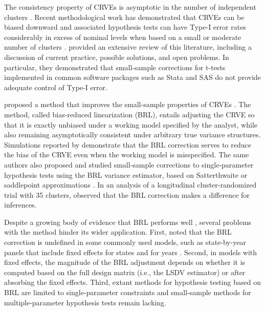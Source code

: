\documentclass[12pt]{article}\usepackage[]{graphicx}\usepackage[]{color}
\begin{document}
The consistency property of CRVEs is asymptotic in the number of independent clusters \citep{Wooldridge2003cluster}.
Recent methodological work has demonstrated that CRVEs can be biased downward and associated hypothesis tests can have Type-I error rates considerably in excess of nominal levels when based on a small or moderate number of clusters \citep[e.g.,][]{MacKinnon2016wild}.
\citet{Cameron2015practitioners} provided an extensive review of this literature, including a discussion of current practice, possible solutions, and open problems. 
In particular, they demonstrated that small-sample corrections for t-tests implemented in common software packages such as Stata and SAS do not provide adequate control of Type-I error. 

\citet{Bell2002bias} proposed a method that improves the small-sample properties of CRVEs \citep[see also][]{McCaffrey2001generalizations}. 
The method, called bias-reduced linearization (BRL), entails adjusting the CRVE so that it is exactly unbiased under a working model specified by the analyst, while also remaining asymptotically consistent under arbitrary true variance structures. 
Simulations reported by \citet{Bell2002bias} demonstrate that the BRL correction serves to reduce the bias of the CRVE even when the working model is misspecified. 
The same authors also proposed and studied small-sample corrections to single-parameter hypothesis tests using the BRL variance estimator, based on Satterthwaite \citep{Bell2002bias} or saddlepoint approximations \citep{McCaffrey2006improved}. 
In an analysis of a longitudinal cluster-randomized trial with 35 clusters, \citet{Angrist2009effects} observed that the BRL correction makes a difference for inferences. 

Despite a growing body of evidence that BRL performs well \citep[e.g.,][]{Imbens2015robust}, several problems with the method hinder its wider application. 
First, \citet{Angrist2009mostly} noted that the BRL correction is undefined in some commonly used models, such as state-by-year panels that include fixed effects for states and for years \citep[see also][]{Young2016improved}.
Second, in models with fixed effects, the magnitude of the BRL adjustment depends on whether it is computed based on the full design matrix (i.e., the LSDV estimator) or after absorbing the fixed effects.  
Third, extant methods for hypothesis testing based on BRL are limited to single-parameter constraints \citep{Bell2002bias, McCaffrey2006improved} and small-sample methods for multiple-parameter hypothesis tests remain lacking.
\end{document}
